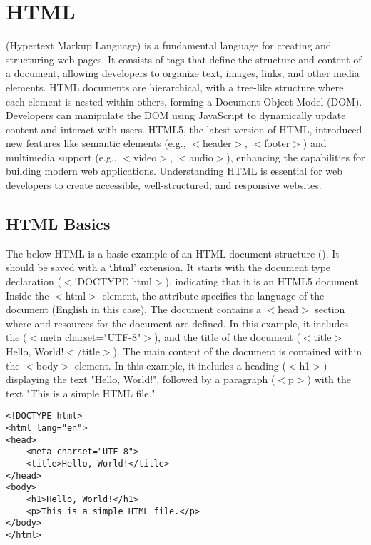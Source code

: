 \chapter{HTML}
\thispagestyle{fancy}
\lstset{}\lstset{language=html, style=htmlstyle}

 (Hypertext Markup Language) is a fundamental language for creating and structuring web pages. It consists of tags that define the structure and content of a document, allowing developers to organize text, images, links, and other media elements. HTML documents are hierarchical, with a tree-like structure where each element is nested within others, forming a Document Object Model (DOM). Developers can manipulate the DOM using JavaScript to dynamically update content and interact with users. HTML5, the latest version of HTML, introduced new features like semantic elements (e.g., $<$header$>$, $<$footer$>$) and multimedia support (e.g., $<$video$>$, $<$audio$>$), enhancing the capabilities for building modern web applications. Understanding HTML is essential for web developers to create accessible, well-structured, and responsive websites.



\section{HTML Basics}

The below HTML is a basic example of an HTML document structure (). It should be saved with a `.html' extension. It starts with the document type declaration ($<$!DOCTYPE html$>$), indicating that it is an HTML5 document. Inside the $<$html$>$ element, the  attribute specifies the language of the document (English in this case). The document contains a $<$head$>$ section where  and resources for the document are defined. In this example, it includes the  ($<$meta charset="UTF-8"$>$), and the title of the document ($<$title$>$Hello, World!$<$/title$>$). The main content of the document is contained within the $<$body$>$ element. In this example, it includes a heading ($<$h1$>$) displaying the text "Hello, World!", followed by a paragraph ($<$p$>$) with the text "This is a simple HTML file."

\begin{lstlisting}
<!DOCTYPE html>
<html lang="en">
<head>
    <meta charset="UTF-8">
    <title>Hello, World!</title>
</head>
<body>
    <h1>Hello, World!</h1>
    <p>This is a simple HTML file.</p>
</body>
</html>
\end{lstlisting}


